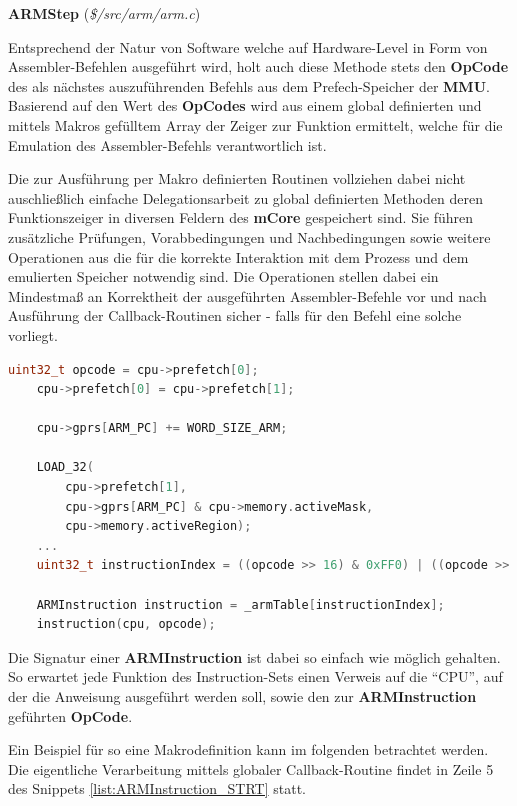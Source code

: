 \documentclass[11pt,a4paper]{scrartcl}
\newcommand{\paratitlecode}[2] {
    \vspace{5mm}
    \large \textbf{#1} \normalsize(\textit{\${#2}})
    \vspace{2mm}\newline
}
\begin{document}
\paratitlecode{ARMStep}{/src/arm/arm.c}
Entsprechend der Natur von Software welche auf Hardware-Level in Form von Assembler-Befehlen ausgef\"uhrt wird, holt auch diese Methode stets den \textbf{OpCode} des als n\"achstes auszuf\"uhrenden Befehls aus dem Prefech-Speicher der \textbf{MMU}. Basierend auf den Wert des \textbf{OpCodes} wird aus einem global definierten und mittels Makros gef\"ulltem Array der Zeiger zur Funktion ermittelt, welche f\"ur die Emulation des Assembler-Befehls verantwortlich ist.

Die zur Ausf\"uhrung per Makro definierten Routinen vollziehen dabei nicht auschlie{\ss}lich einfache Delegationsarbeit zu global definierten Methoden deren Funktionszeiger in diversen Feldern des \textbf{mCore} gespeichert sind. Sie f\"uhren zus\"atzliche Pr\"ufungen, Vorabbedingungen und Nachbedingungen sowie weitere Operationen aus die f\"ur die korrekte Interaktion mit dem Prozess und dem emulierten Speicher notwendig sind. Die Operationen stellen dabei ein Mindestma{\ss} an Korrektheit der ausgef\"uhrten Assembler-Befehle vor und nach Ausf\"uhrung der Callback-Routinen sicher - falls f\"ur den Befehl eine solche vorliegt.

\vspace{5mm}
\begin{lstlisting}[language=C++, caption={Ausschnitt aus der \textbf{ARMStep}-Methode}, label={list:ARMStep}]
    uint32_t opcode = cpu->prefetch[0];
	cpu->prefetch[0] = cpu->prefetch[1];

	cpu->gprs[ARM_PC] += WORD_SIZE_ARM;
	
	LOAD_32(
	    cpu->prefetch[1],
	    cpu->gprs[ARM_PC] & cpu->memory.activeMask,
	    cpu->memory.activeRegion);
    ...
	uint32_t instructionIndex = ((opcode >> 16) & 0xFF0) | ((opcode >> 4) & 0x00F);
	
	ARMInstruction instruction = _armTable[instructionIndex];
	instruction(cpu, opcode);
\end{lstlisting}

Die Signatur einer \textbf{ARMInstruction} ist dabei so einfach wie m\"oglich gehalten. So erwartet jede Funktion des Instruction-Sets einen Verweis auf die \enquote{CPU}, auf der die Anweisung ausgef\"uhrt werden soll, sowie den zur \textbf{ARMInstruction} gef\"uhrten \textbf{OpCode}.

Ein Beispiel f\"ur so eine Makrodefinition kann im folgenden betrachtet werden. Die eigentliche Verarbeitung mittels globaler Callback-Routine findet in Zeile 5 des Snippets \ref{list:ARMInstruction_STRT} statt.
\end{document}

